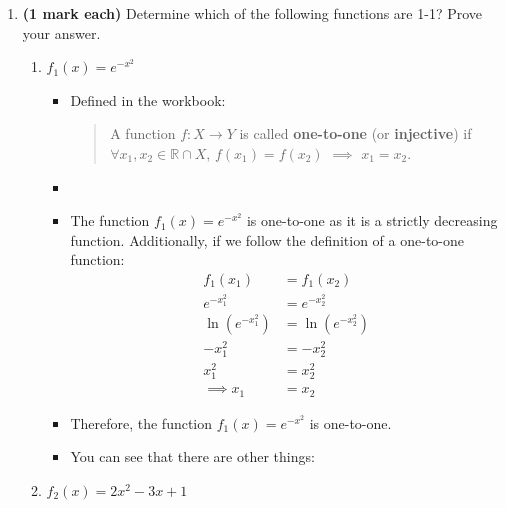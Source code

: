\documentclass[12pt]{report}
\begin{document}
\begin{enumerate}[leftmargin=\labelsep]
    \item {\bf (1 mark each)} Determine which of the following functions are 1-1? Prove your answer.
        \begin{enumerate}
            \item $f_1(x)=e^{-x^2}$
                \begin{tcolorbox}
                    \begin{itemize}[label={}]
                        \item Defined in the workbook:
                        \begin{quote}
                            A function $f: X\to Y$ is called {\bf one-to-one} (or {\bf injective}) if $\forall x_1,x_2 \in \mathbb{R} \cap X$, $f(x_1)=f(x_2)$ $\implies$ $x_1=x_2$.
                        \end{quote}
                        \item
                        \item The function $f_1(x)=e^{-x^2}$ is one-to-one as it is a strictly decreasing function. Additionally, if we follow the definition of a one-to-one function:
                        \begin{equation*}
                            \begin{split}
                                f_1(x_1) &= f_1(x_2) \\
                                e^{-x_1^2} &= e^{-x_2^2} \\
                                \ln (e^{-x_1^2}) &= \ln (e^{-x_2^2}) \\
                                -x_1^2 &= -x_2^2 \\
                                x_1^2 &= x_2^2 \\
                                \implies x_1 &= x_2
                            \end{split}
                        \end{equation*}
                        \item Therefore, the function $f_1(x)=e^{-x^2}$ is one-to-one.
                        \item You can see that there are other things:
                    \end{itemize}
                \end{tcolorbox}
\newpage
            \item $f_2(x)=2x^2-3x+1$
                \begin{tcolorbox}

\end{tcolorbox}
\end{enumerate}
\end{enumerate}
\end{document}
